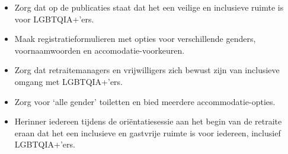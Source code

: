 \documentclass[12pt,openany]{book}
\begin{document}
\begin{itemize}
  \setlength\itemsep{-0.3em}
  \item Zorg dat op de publicaties staat dat het een veilige en inclusieve ruimte is voor LGBTQIA+'ers.
  \item Maak registratieformulieren met opties voor verschillende genders, voornaamwoorden en accomodatie-voorkeuren.
  \item Zorg dat retraitemanagers en vrijwilligers zich bewust zijn van inclusieve omgang met LGBTQIA+'ers.
  \item Zorg voor `alle gender' toiletten en bied meerdere accommodatie-opties.
  \item Herinner iedereen tijdens de oriëntatiesessie aan het begin van de retraite eraan dat het een inclusieve en gastvrije ruimte is voor iedereen, inclusief LGBTQIA+'ers.
\end{itemize}

\begin{figure}[h]
    \centering
\end{figure}

\newpage
\thispagestyle{empty}
\begin{figure}[h]
    \centering
\end{figure}
\end{document}
